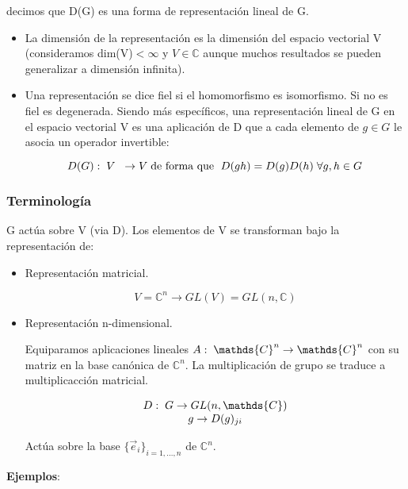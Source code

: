 \documentclass{article}
\begin{document}
decimos que D(G) es una forma de representación lineal de G.

\begin{itemize}
\item La dimensión de la representación es la dimensión del espacio vectorial V (consideramos dim(V)$<\infty$ y $V\in \mathds{C}$ aunque muchos resultados se pueden generalizar a dimensión infinita).
\item Una representación se dice fiel si el homomorfismo es isomorfismo. Si no es fiel es degenerada. Siendo más específicos, una representación lineal de G en el espacio vectorial V es una aplicación de D que a cada elemento de $g\in G$ le asocia un operador invertible:

$$D(G): \hspace{0.1cm} V \hspace{0.2cm} \to V \hspace{0.1cm}\text{de forma que } \hspace{0.1cm} D(gh)=D(g)D(h)\hspace{0.1cm} \forall g,h \in G$$
\end{itemize}

\subsubsection{Terminología}
G actúa sobre V (via D). Los elementos de V se transforman bajo la representación de:

\begin{itemize}
\item Representación matricial.

$$V=\mathds{C}^n\to GL(V)=GL(n, \mathds{C})$$
\item Representación n-dimensional.

Equiparamos aplicaciones lineales $A: \hspace{0.1cm} \mathds{C}^n \to  \mathds{C}^n$ con su matriz en la base canónica de $\mathds{C}^n$. La multiplicación de grupo se traduce a multiplicacción matricial.

$$\begin{array}{cc}
D: \hspace{0.1cm}G \to GL(n, \mathds{C}) \\
g\to D(g)_{ji}
\end{array}$$

Actúa sobre la base $\lbrace \Vec{e}_i\rbrace_{i=1,...,n}$ de $\mathds{C}^n$.
\end{itemize}

\textbf{Ejemplos}:
\end{document}
